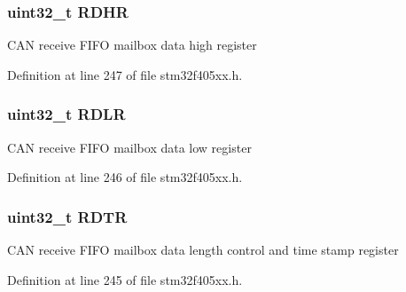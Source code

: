\subsubsection[{\texorpdfstring{R\+D\+HR}{RDHR}}]{ uint32\+\_\+t R\+D\+HR}\hypertarget{struct_c_a_n___f_i_f_o_mail_box___type_def_a7f11f42ba9d3bc5cd4a4f5ea0214608e}{}\label{struct_c_a_n___f_i_f_o_mail_box___type_def_a7f11f42ba9d3bc5cd4a4f5ea0214608e}
C\+AN receive F\+I\+FO mailbox data high register 

Definition at line 247 of file stm32f405xx.\+h.

\subsubsection[{\texorpdfstring{R\+D\+LR}{RDLR}}]{ uint32\+\_\+t R\+D\+LR}\hypertarget{struct_c_a_n___f_i_f_o_mail_box___type_def_ae1c569688eedd49219cd505b9c22121b}{}\label{struct_c_a_n___f_i_f_o_mail_box___type_def_ae1c569688eedd49219cd505b9c22121b}
C\+AN receive F\+I\+FO mailbox data low register 

Definition at line 246 of file stm32f405xx.\+h.

\subsubsection[{\texorpdfstring{R\+D\+TR}{RDTR}}]{ uint32\+\_\+t R\+D\+TR}\hypertarget{struct_c_a_n___f_i_f_o_mail_box___type_def_a9563d8a88d0db403b8357331bea83a2e}{}\label{struct_c_a_n___f_i_f_o_mail_box___type_def_a9563d8a88d0db403b8357331bea83a2e}
C\+AN receive F\+I\+FO mailbox data length control and time stamp register 

Definition at line 245 of file stm32f405xx.\+h.

